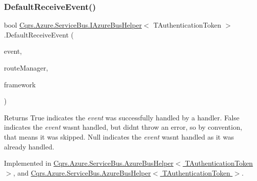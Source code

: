 \subsubsection{\texorpdfstring{Default\+Receive\+Event()}{DefaultReceiveEvent()}}
{\footnotesize\ttfamily bool \hyperlink{interfaceCqrs_1_1Azure_1_1ServiceBus_1_1IAzureBusHelper}{Cqrs.\+Azure.\+Service\+Bus.\+I\+Azure\+Bus\+Helper}$<$ T\+Authentication\+Token $>$.Default\+Receive\+Event (\begin{DoxyParamCaption}\item[{\hyperlink{interfaceCqrs_1_1Events_1_1IEvent}{I\+Event}$<$ T\+Authentication\+Token $>$ @}]{event,  }\item[{\hyperlink{classCqrs_1_1Bus_1_1RouteManager}{Route\+Manager}}]{route\+Manager,  }\item[{string}]{framework }\end{DoxyParamCaption})}

\begin{DoxyReturn}{Returns}
True indicates the {\itshape event}  was successfully handled by a handler. False indicates the {\itshape event}  wasn\textquotesingle{}t handled, but didn\textquotesingle{}t throw an error, so by convention, that means it was skipped. Null indicates the {\itshape event}  wasn\textquotesingle{}t handled as it was already handled. 
\end{DoxyReturn}


Implemented in \hyperlink{classCqrs_1_1Azure_1_1ServiceBus_1_1AzureBusHelper_a0139f99e393214427b9a711bf27cae40_a0139f99e393214427b9a711bf27cae40}{Cqrs.\+Azure.\+Service\+Bus.\+Azure\+Bus\+Helper$<$ T\+Authentication\+Token $>$}, and \hyperlink{classCqrs_1_1Azure_1_1ServiceBus_1_1AzureBusHelper_a0139f99e393214427b9a711bf27cae40_a0139f99e393214427b9a711bf27cae40}{Cqrs.\+Azure.\+Service\+Bus.\+Azure\+Bus\+Helper$<$ T\+Authentication\+Token $>$}.

\mbox{\label{interfaceCqrs_1_1Azure_1_1ServiceBus_1_1IAzureBusHelper_a283ee2cf9241a5364dd5569a9f12fa10_a283ee2cf9241a5364dd5569a9f12fa10}} 
